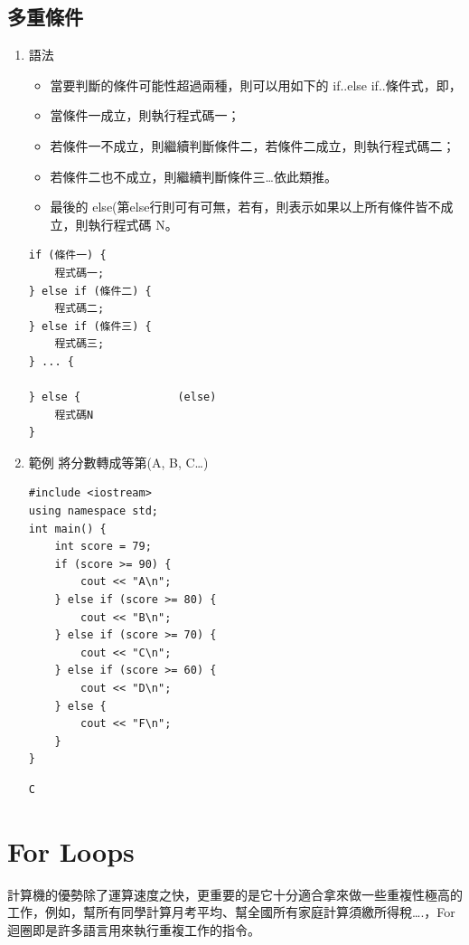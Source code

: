 \documentclass[a4paper,12pt]{article}
\begin{document}
\subsection{多重條件}
\label{cpp_multi_conditions}
\begin{enumerate}
\item 語法
\label{sec:orgcb123bf}
\begin{itemize}
\item 當要判斷的條件可能性超過兩種，則可以用如下的 if..else if..條件式，即，\\
\item 當條件一成立，則執行程式碼一；\\
\item 若條件一不成立，則繼續判斷條件二，若條件二成立，則執行程式碼二；\\
\item 若條件二也不成立，則繼續判斷條件三\ldots{}依此類推。\\
\item 最後的 else(第else行則可有可無，若有，則表示如果以上所有條件皆不成立，則執行程式碼 N。\\
\end{itemize}
\lstset{breaklines=true,language=cpp,label= ,caption= ,captionpos=b,numbers=none}
\begin{lstlisting}
if (條件一) {
    程式碼一;
} else if (條件二) {
    程式碼二;
} else if (條件三) {
    程式碼三;
} ... {

} else {               (else)
    程式碼N
}
\end{lstlisting}
\item 範例
\label{sec:orgd5e4b5c}
將分數轉成等第(A, B, C\ldots{})\\
\lstset{breaklines=true,language=cpp,label= ,caption= ,captionpos=b,firstnumber=1,numbers=left}
\begin{lstlisting}
#include <iostream>
using namespace std;
int main() {
    int score = 79;
    if (score >= 90) {
        cout << "A\n";
    } else if (score >= 80) {
        cout << "B\n";
    } else if (score >= 70) {
        cout << "C\n";
    } else if (score >= 60) {
        cout << "D\n";
    } else {
        cout << "F\n";
    }
}
\end{lstlisting}

\begin{verbatim}
C
\end{verbatim}
\end{enumerate}

\section{For Loops}
\label{cpp_for_loop}
計算機的優勢除了運算速度之快，更重要的是它十分適合拿來做一些重複性極高的工作，例如，幫所有同學計算月考平均、幫全國所有家庭計算須繳所得稅\ldots{}.，For 迴圈即是許多語言用來執行重複工作的指令。\\
\end{document}

